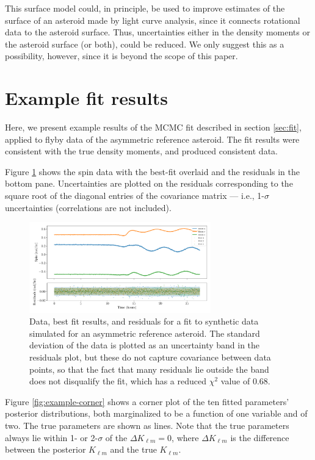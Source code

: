 \documentclass[fleqn,usenatbib]{mnras}
\begin{document}
This surface model could, in principle, be used to improve estimates of the surface of an asteroid made by light curve analysis, since it connects rotational data to the asteroid surface. Thus, uncertainties either in the density moments or the asteroid surface (or both), could be reduced. We only suggest this as a possibility, however, since it is beyond the scope of this paper.


\section{Example fit results}
\label{app:example}

Here, we present example results of the MCMC fit described in section \ref{sec:fit}, applied to flyby data of the asymmetric reference asteroid. The fit results were consistent with the true density moments, and produced consistent data.

Figure \ref{fig:example-residuals} shows the spin data with the best-fit overlaid and the residuals in the bottom pane. Uncertainties are plotted on the residuals corresponding to the square root of the diagonal entries of the covariance matrix --- i.e., 1-$\sigma$ uncertainties (correlations are not included).

\begin{figure}
  \centering
  \includegraphics[width=0.7\textwidth]{figs/example-residuals.pdf}
  \caption{Data, best fit results, and residuals for a fit to synthetic data simulated for an asymmetric reference asteroid. The standard deviation of the data is plotted as an uncertainty band in the residuals plot, but these do not capture covariance between data points, so that the fact that many residuals lie outside the band does not disqualify the fit, which has a reduced $\chi^2$ value of 0.68.}
  \label{fig:example-residuals}
\end{figure}

Figure \ref{fig:example-corner} shows a corner plot of the ten fitted parameters' posterior distributions, both marginalized to be a function of one variable and of two. The true parameters are shown as lines. Note that the true parameters always lie within 1- or 2-$\sigma$ of the $\Delta K_{\ell m} = 0$, where $\Delta K_{\ell m}$ is the difference between the posterior $K_{\ell m}$ and the true $K_{\ell m}$.
\end{document}
